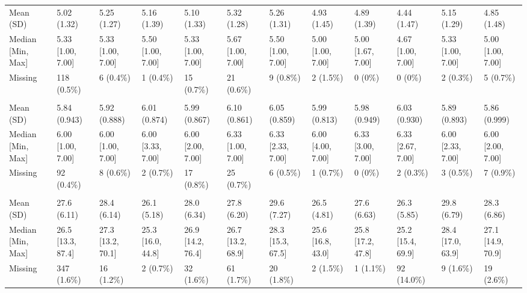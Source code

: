 \documentclass[
  single column]{article}
\begin{document}
\begin{landscape}
\begin{tabular}[t]{llllllllllll}
\hspace{1em}Mean (SD) & 5.02 (1.32) & 5.25 (1.27) & 5.16 (1.39) & 5.10 (1.33) & 5.32 (1.28) & 5.26 (1.31) & 4.93 (1.45) & 4.89 (1.39) & 4.44 (1.47) & 5.15 (1.29) & 4.85 (1.48)\\
\hspace{1em}Median [Min, Max] & 5.33 [1.00, 7.00] & 5.33 [1.00, 7.00] & 5.50 [1.00, 7.00] & 5.33 [1.00, 7.00] & 5.67 [1.00, 7.00] & 5.50 [1.00, 7.00] & 5.00 [1.00, 7.00] & 5.00 [1.67, 7.00] & 4.67 [1.00, 7.00] & 5.33 [1.00, 7.00] & 5.00 [1.00, 7.00]\\
\hspace{1em}Missing & 118 (0.5\%) & 6 (0.4\%) & 1 (0.4\%) & 15 (0.7\%) & 21 (0.6\%) & 9 (0.8\%) & 2 (1.5\%) & 0 (0\%) & 0 (0\%) & 2 (0.3\%) & 5 (0.7\%)\\
\addlinespace[0.3em]
\multicolumn{12}{l}{\textbf{Gratitude}}\\
\hspace{1em}Mean (SD) & 5.84 (0.943) & 5.92 (0.888) & 6.01 (0.874) & 5.99 (0.867) & 6.10 (0.861) & 6.05 (0.859) & 5.99 (0.813) & 5.98 (0.949) & 6.03 (0.930) & 5.89 (0.893) & 5.86 (0.999)\\
\hspace{1em}Median [Min, Max] & 6.00 [1.00, 7.00] & 6.00 [1.00, 7.00] & 6.00 [3.33, 7.00] & 6.00 [2.00, 7.00] & 6.33 [1.00, 7.00] & 6.33 [2.33, 7.00] & 6.00 [4.00, 7.00] & 6.33 [3.00, 7.00] & 6.33 [2.67, 7.00] & 6.00 [2.33, 7.00] & 6.00 [2.00, 7.00]\\
\hspace{1em}Missing & 92 (0.4\%) & 8 (0.6\%) & 2 (0.7\%) & 17 (0.8\%) & 25 (0.7\%) & 6 (0.5\%) & 1 (0.7\%) & 0 (0\%) & 2 (0.3\%) & 3 (0.5\%) & 7 (0.9\%)\\
\addlinespace[0.3em]
\multicolumn{12}{l}{\textbf{hlth\_bmi}}\\
\hspace{1em}Mean (SD) & 27.6 (6.11) & 28.4 (6.14) & 26.1 (5.18) & 28.0 (6.34) & 27.8 (6.20) & 29.6 (7.27) & 26.5 (4.81) & 27.6 (6.63) & 26.3 (5.85) & 29.8 (6.79) & 28.3 (6.86)\\
\hspace{1em}Median [Min, Max] & 26.5 [13.3, 87.4] & 27.3 [13.2, 70.1] & 25.3 [16.0, 44.8] & 26.9 [14.2, 76.4] & 26.7 [13.2, 68.9] & 28.3 [15.3, 67.5] & 25.6 [16.8, 43.0] & 25.8 [17.2, 47.8] & 25.2 [15.4, 69.9] & 28.4 [17.0, 63.9] & 27.1 [14.9, 70.9]\\
\hspace{1em}Missing & 347 (1.6\%) & 16 (1.2\%) & 2 (0.7\%) & 32 (1.6\%) & 61 (1.7\%) & 20 (1.8\%) & 2 (1.5\%) & 1 (1.1\%) & 92 (14.0\%) & 9 (1.6\%) & 19 (2.6\%)\\

\end{tabular}
\end{landscape}
\end{document}

